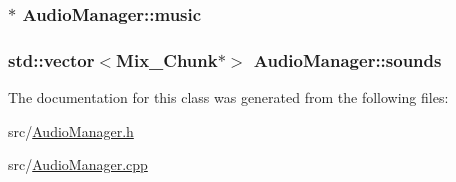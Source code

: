 \hypertarget{class_audio_manager_ac2db72d9907112162225826056ee7f11}{
\subsubsection[{music}]{$\ast$ Audio\-Manager\-::music}}\label{class_audio_manager_ac2db72d9907112162225826056ee7f11}
\hypertarget{class_audio_manager_a2052962e50b4372aa9c0621f48e65e59}{
\subsubsection[{sounds}]{\setlength{\rightskip}{0pt plus 5cm}std\-::vector$<${\bf Mix\-\_\-\-Chunk}$\ast$$>$ Audio\-Manager\-::sounds}}\label{class_audio_manager_a2052962e50b4372aa9c0621f48e65e59}


The documentation for this class was generated from the following files\-:\begin{DoxyCompactItemize}
\item 
src/\hyperlink{_audio_manager_8h}{Audio\-Manager.\-h}\item 
src/\hyperlink{_audio_manager_8cpp}{Audio\-Manager.\-cpp}\end{DoxyCompactItemize}
